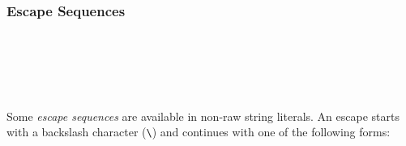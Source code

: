 \subsubsection*{Escape Sequences}

\begin{bnf}
   \eq {} \gor {} \gor {} \gor {} \gor {} \gor \term{\textbackslash \textbackslash} \gor {} \\
   \eq {} \  \  \\
   \eq {} \  \ \term{\}} \\
  \\
   \eq {} \gor {} \gor {}
\end{bnf}

Some \emph{escape sequences} are available in non-raw string literals. An escape starts with a backslash character (\texttt{\textbackslash}) and continues with one of the following forms:

